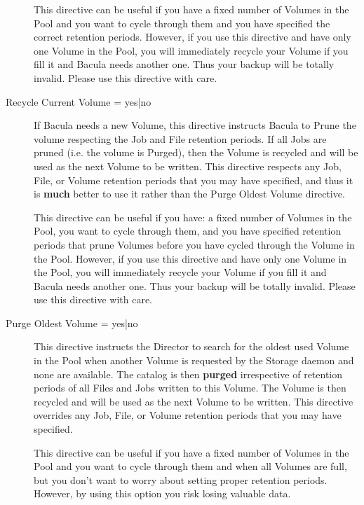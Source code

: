 \begin{description}
This directive can be useful if you have a fixed number of Volumes in the
Pool and you want to cycle through them and you have specified the correct
retention periods.  
However, if you use this directive and have only one
Volume in the Pool, you will immediately recycle your Volume if you fill
it and Bacula needs another one. Thus your backup will be totally invalid.
Please use this directive with care.

\label{RecycleCurrent}

\item [Recycle Current Volume = \lt{}yes|no\gt{}]
   If  Bacula needs a new Volume, this directive instructs Bacula  to Prune the
volume respecting the Job and File  retention periods.  If all Jobs are pruned
(i.e. the volume is Purged), then  the Volume is recycled and will be used as
the next  Volume to be written. This directive respects any Job,  File, or
Volume retention periods that you may have specified,  and thus it is {\bf
much} better to use it rather  than the Purge Oldest Volume directive.  

This directive can be useful if you have:  a fixed number of Volumes in the
Pool, you want to  cycle through them, and you have specified  retention
periods that prune Volumes before  you have cycled through the Volume in the
Pool.  
However, if you use this directive and have only one
Volume in the Pool, you will immediately recycle your Volume if you fill
it and Bacula needs another one. Thus your backup will be totally invalid.
Please use this directive with care.

\label{PurgeOldest}

\item [Purge Oldest Volume = \lt{}yes|no\gt{}]
   This directive  instructs the Director to search for the oldest used  Volume
in the Pool when another Volume is requested by  the Storage daemon and none
are available.  The catalog is then {\bf purged} irrespective of retention 
periods of all Files and Jobs written to this Volume.  The Volume is then
recycled and will be used as the next  Volume to be written. This directive
overrides any Job,  File, or Volume retention periods that you may have
specified.  

This directive can be useful if you have  a fixed number of Volumes in the
Pool and you want to  cycle through them and when all Volumes are full, but
you don't  want to worry about setting proper retention periods. However,  by
using this option you risk losing valuable data.  


\end{description}

